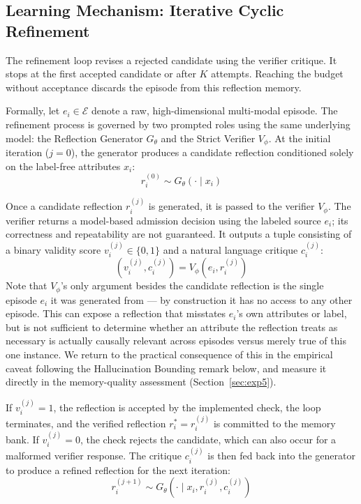 \documentclass[onecolumn]{IEEEtran}
\numberwithin{equation}{section}
\theoremstyle{definition}
\theoremstyle{remark}
\begin{document}
\subsection{Learning Mechanism: Iterative Cyclic Refinement}

The refinement loop revises a rejected candidate using the verifier critique. It stops at the first accepted candidate or after $K$ attempts. Reaching the budget without acceptance discards the episode from this reflection memory.

Formally, let $e_i \in \mathcal{E}$ denote a raw, high-dimensional multi-modal episode. The refinement process is governed by two prompted roles using the same underlying model: the Reflection Generator $G_\theta$ and the Strict Verifier $V_\phi$. At the initial iteration ($j=0$), the generator produces a candidate reflection conditioned solely on the label-free attributes $x_i$:
\begin{equation}
    r_i^{(0)} \sim G_\theta(\cdot \mid x_i)
\end{equation}

Once a candidate reflection $r_i^{(j)}$ is generated, it is passed to the verifier $V_\phi$. The verifier returns a model-based admission decision using the labeled source $e_i$; its correctness and repeatability are not guaranteed. It outputs a tuple consisting of a binary validity score $v_i^{(j)} \in \{0, 1\}$ and a natural language critique $c_i^{(j)}$:
\begin{equation}
    (v_i^{(j)}, c_i^{(j)}) = V_\phi(e_i, r_i^{(j)})
    \label{eq:verifier}
\end{equation}
Note that $V_\phi$'s only argument besides the candidate reflection is the single episode $e_i$ it was generated from — by construction it has no access to any other episode. This can expose a reflection that misstates $e_i$'s own attributes or label, but is not sufficient to determine whether an attribute the reflection treats as necessary is actually causally relevant across episodes versus merely true of this one instance. We return to the practical consequence of this in the empirical caveat following the Hallucination Bounding remark below, and measure it directly in the memory-quality assessment (Section~\ref{sec:exp5}).

If $v_i^{(j)} = 1$, the reflection is accepted by the implemented check, the loop terminates, and the verified reflection $r_i^* = r_i^{(j)}$ is committed to the memory bank. If $v_i^{(j)} = 0$, the check rejects the candidate, which can also occur for a malformed verifier response. The critique $c_i^{(j)}$ is then fed back into the generator to produce a refined reflection for the next iteration:
\begin{equation}
    r_i^{(j+1)} \sim G_\theta(\cdot \mid x_i, r_i^{(j)}, c_i^{(j)})
\end{equation}
\end{document}
